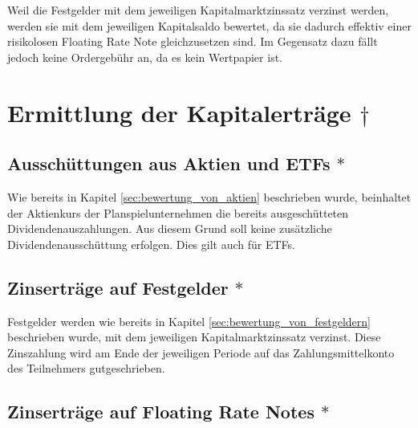 \documentclass[12pt, a4paper]{article}
\begin{document}
Weil die Festgelder mit dem jeweiligen Kapitalmarktzinssatz verzinst werden, werden sie mit dem jeweiligen Kapitalsaldo bewertet, da sie dadurch effektiv einer risikolosen Floating Rate Note gleichzusetzen sind. Im Gegensatz dazu fällt jedoch keine Ordergebühr an, da es kein Wertpapier ist.

\section{Ermittlung der Kapitalerträge $\dagger$}
\label{sec:ermittlung_von_wertpapierertraegen}

\subsection{Ausschüttungen aus Aktien und ETFs $\ast$}
\label{sec:ausschuettung_aus_aktie}
Wie bereits in Kapitel \ref{sec:bewertung_von_aktien} beschrieben wurde, beinhaltet der Aktienkurs der Planspielunternehmen die bereits ausgeschütteten Dividendenauszahlungen. Aus diesem Grund soll keine zusätzliche Dividendenausschüttung erfolgen. Dies gilt auch für ETFs.

\subsection{Zinserträge auf Festgelder $\ast$}
\label{sec:zinsertraege_auf_festgelder}
Festgelder werden wie bereits in Kapitel \ref{sec:bewertung_von_festgeldern} beschrieben wurde, mit dem jeweiligen Kapitalmarktzinssatz verzinst. Diese Zinszahlung wird am Ende der jeweiligen Periode auf das Zahlungsmittelkonto des Teilnehmers gutgeschrieben.

\subsection{Zinserträge auf Floating Rate Notes $\ast$}
\label{sec:zinsertraege_auf_floating_rate_notes}

\printbibliography[title={Literatur}]
\end{document}
